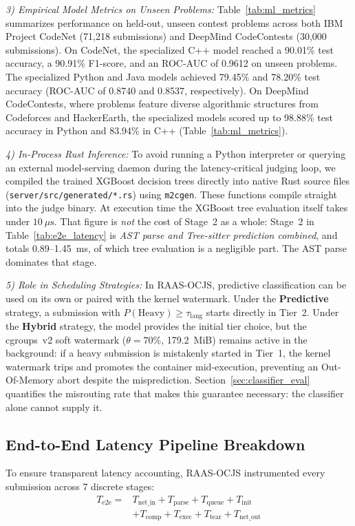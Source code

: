 \documentclass[conference]{IEEEtran}
\begin{document}
\textit{3) Empirical Model Metrics on Unseen Problems:}
Table~\ref{tab:ml_metrics} summarizes performance on held-out, unseen contest problems across both IBM Project CodeNet (71,218 submissions) and DeepMind CodeContests (30,000 submissions). On CodeNet, the specialized C++ model reached a 90.01\% test accuracy, a 90.91\% F1-score, and an ROC-AUC of 0.9612 on unseen problems. The specialized Python and Java models achieved 79.45\% and 78.20\% test accuracy (ROC-AUC of 0.8740 and 0.8537, respectively). On DeepMind CodeContests, where problems feature diverse algorithmic structures from Codeforces and HackerEarth, the specialized models scored up to 98.88\% test accuracy in Python and 83.94\% in C++ (Table~\ref{tab:ml_metrics}).

\textit{4) In-Process Rust Inference:}
To avoid running a Python interpreter or querying an external model-serving daemon during the latency-critical judging loop, we compiled the trained XGBoost decision trees directly into native Rust source files (\texttt{server/src/generated/*.rs}) using \texttt{m2cgen}. These functions compile straight into the judge binary. At execution time the XGBoost tree evaluation itself takes under $10\ \mu\text{s}$. That figure is \emph{not} the cost of Stage~2 as a whole: Stage~2 in Table~\ref{tab:e2e_latency} is \emph{AST parse and Tree-sitter prediction combined}, and totals 0.89--1.45~ms, of which tree evaluation is a negligible part. The AST parse dominates that stage.

\textit{5) Role in Scheduling Strategies:}
In RAAS-OCJS, predictive classification can be used on its own or paired with the kernel watermark. Under the \textbf{Predictive} strategy, a submission with $P(\mathrm{Heavy}) \ge \tau_{\mathrm{lang}}$ starts directly in Tier~2. Under the \textbf{Hybrid} strategy, the model provides the initial tier choice, but the cgroups~v2 soft watermark ($\theta = 70\%$, 179.2~MiB) remains active in the background: if a heavy submission is mistakenly started in Tier~1, the kernel watermark trips and promotes the container mid-execution, preventing an Out-Of-Memory abort despite the misprediction. Section~\ref{sec:classifier_eval} quantifies the misrouting rate that makes this guarantee necessary: the classifier alone cannot supply it.

\subsection{End-to-End Latency Pipeline Breakdown}
To ensure transparent latency accounting, RAAS-OCJS instrumented every submission across 7 discrete stages:
\begin{equation}
\begin{aligned}
T_{\mathrm{e2e}} ={}&
T_{\mathrm{net\_in}} + T_{\mathrm{parse}} +
T_{\mathrm{queue}} + T_{\mathrm{init}} \\
&+ T_{\mathrm{comp}} + T_{\mathrm{exec}} +
T_{\mathrm{tear}} + T_{\mathrm{net\_out}}
\end{aligned}
\end{equation}
\end{document}
